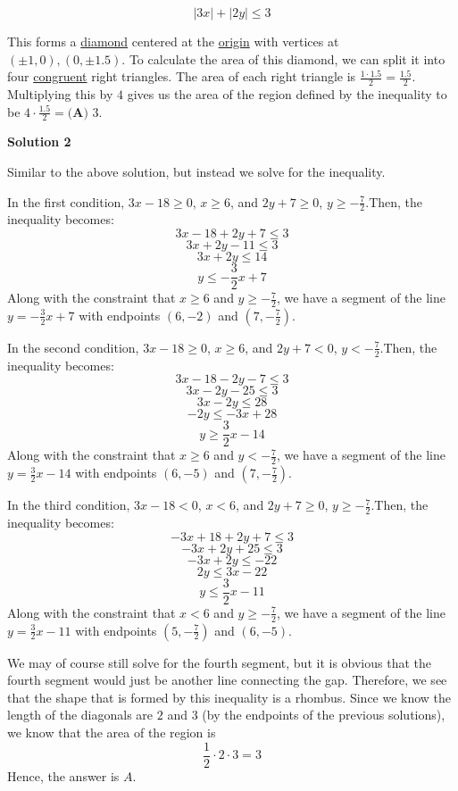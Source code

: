 \begin{enumerate}
 
 \[|3x| + |2y|\leq 3\]

 This forms a \href{https://artofproblemsolving.com/wiki/index.php?title=Rhombus}{diamond} centered at the \href{https://artofproblemsolving.com/wiki/index.php?title=Origin}{origin} with vertices at $(\pm 1, 0), (0, \pm 1.5)$. To calculate the area of this diamond, we can split it into four \href{https://artofproblemsolving.com/wiki/index.php?title=Congruence\_(geometry)}{congruent} right triangles. The area of each right triangle is $\frac{1\cdot1.5}{2}=\frac{1.5}{2}$. Multiplying this by $4$ gives us the area of the region defined by the inequality to be $4\cdot \frac{1.5}{2}=\boxed{\textbf{(A) }3}$.

 



\textbf{Solution 2}

Similar to the above solution, but instead we solve for the inequality.

 In the first condition, $3x - 18 \geq 0$, $x \geq 6$, and $2y + 7 \geq 0$, $y \geq -\frac{7}{2}$.Then, the inequality becomes:
 \[3x - 18 + 2y + 7 \leq 3\]
 \[3x + 2y - 11 \leq 3\]
 \[3x + 2y \leq 14\]
 \[y \leq -\frac{3}{2}x + 7\]Along with the constraint that $x \geq 6$ and $y \geq -\frac{7}{2}$, we have a segment of the line $y = -\frac{3}{2}x + 7$ with endpoints $(6, -2)$ and $(7, -\frac{7}{2})$.

 In the second condition, $3x - 18 \geq 0$, $x \geq 6$, and $2y + 7 < 0$, $y < -\frac{7}{2}$.Then, the inequality becomes:
 \[3x - 18 - 2y - 7 \le 3\]
 \[3x - 2y - 25 \le 3\]
 \[3x - 2y \le 28\]
 \[-2y \le -3x + 28\]
 \[y \geq \frac{3}{2}x - 14\]Along with the constraint that $x \geq 6$ and $y < -\frac{7}{2}$, we have a segment of the line $y = \frac{3}{2}x - 14$ with endpoints $(6, -5)$ and $(7, -\frac{7}{2})$.

 In the third condition, $3x - 18 < 0$, $x < 6$, and $2y + 7 \geq 0$, $y \geq -\frac{7}{2}$.Then, the inequality becomes:
 \[-3x + 18 + 2y + 7 \leq 3\]
 \[-3x + 2y + 25 \leq 3\]
 \[-3x + 2y \leq -22\]
 \[2y \leq 3x - 22\]
 \[y \leq \frac{3}{2}x - 11\]Along with the constraint that $x < 6$ and $y \geq -\frac{7}{2}$, we have a segment of the line $y = \frac{3}{2}x - 11$ with endpoints $(5, -\frac{7}{2})$ and $(6, -5)$.

 We may of course still solve for the fourth segment, but it is obvious that the fourth segment would just be another line connecting the gap. Therefore, we see that the shape that is formed by this inequality is a rhombus. Since we know the length of the diagonals are $2$ and $3$ (by the endpoints of the previous solutions), we know that the area of the region is 
 \[\frac{1}{2} \cdot 2 \cdot 3 = 3\]Hence, the answer is $\boxed{A}$.


\end{enumerate}
